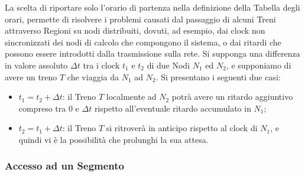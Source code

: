 	La scelta di riportare solo l'orario di partenza nella definizione della Tabella degli orari, permette di risolvere i problemi causati dal passaggio di alcuni Treni attraverso Regioni su nodi distribuiti, dovuti, ad esempio, dai clock non sincronizzati dei nodi di calcolo che compongono il sistema, o dai ritardi che possono essere introdotti dalla trasmissione sulla rete. Si supponga una differenza in valore assoluto $\Delta t$ tra i clock $t_1$ e $t_2$ di due Nodi $N_1$ ed $N_2$, e supponiamo di avere un treno $T$ che viaggia da $N_1$ ad $N_2$. Si presentano i seguenti due casi:
	
	\begin{itemize}
		\item $t_1 = t_2+\Delta t$: il Treno $T$ localmente ad $N_2$ potrà avere un ritardo aggiuntivo compreso tra $0$ e $\Delta t$ rispetto all'eventuale ritardo accumulato in $N_1$;
		\item $t_2 = t_1+\Delta t$: il Treno $T$ si ritroverà in anticipo rispetto al clock di $N_1$, e quindi vi è la possibilità che prolunghi la sua attesa.
	\end{itemize}
	
	
	
		\subsubsection{Accesso ad un Segmento}\label{subsubsec:segment_access}
		
